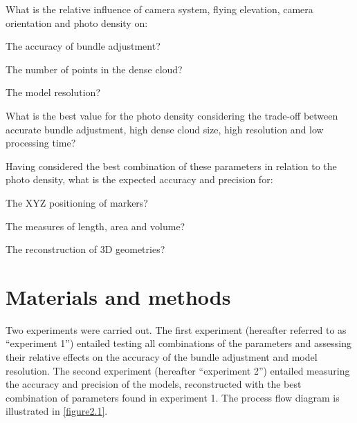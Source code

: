 
\begin{inparaenum}
  \item What is the relative influence of camera system, flying elevation, camera orientation and photo density on:
  \begin{inparaenum}
    \item The accuracy of bundle adjustment?
    \item The number of points in the dense cloud?
    \item The model resolution?
  \end{inparaenum}
  \item What is the best value for the photo density considering the trade-off between accurate bundle adjustment, high dense cloud size, high resolution and low processing time?
   \item Having considered the best combination of these parameters in relation to the photo density, what is the expected accuracy and precision for:
  \begin{inparaenum}
    \item The XYZ positioning of markers? 
    \item The measures of length, area and volume?
    \item The reconstruction of 3D geometries?
  \end{inparaenum}
\end{inparaenum}

\section{Materials and methods}\label{chapitre2_2}

Two experiments were carried out. The first experiment (hereafter referred to as “experiment 1”) entailed testing all combinations of the parameters and assessing their relative effects on the accuracy of the bundle adjustment and model resolution. The second experiment (hereafter “experiment 2”) entailed measuring the accuracy and precision of the models, reconstructed with the best combination of parameters found in experiment 1. The process flow diagram is illustrated in \autoref{figure2.1}.


